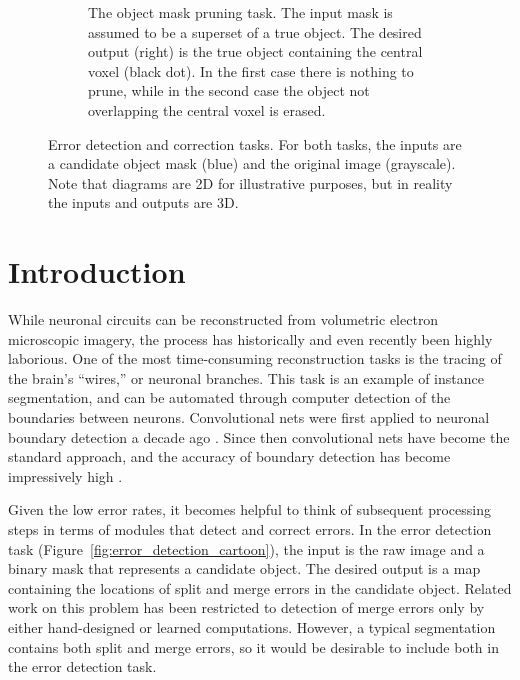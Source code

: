\documentclass{article}
\begin{document}
\begin{figure}[t!]
\begin{center}
\begin{subfigure}[t]{0.45\textwidth}
	\caption{The object mask pruning task. The input mask is assumed to be a superset of a true object. The desired output (right) is the true object containing the central voxel (black dot). In the first case there is nothing to prune, while in the second case the object not overlapping the central voxel is erased.}
	\label{fig:error_correction_cartoon}
\end{subfigure}
        \end{center}
        \caption{Error detection and correction tasks.  For both tasks, the inputs are a candidate object mask (blue) and the original image (grayscale). Note that diagrams are 2D for illustrative purposes, but in reality the inputs and outputs are 3D.}
\end{figure}

\section{Introduction}
While neuronal circuits can be reconstructed from volumetric electron
microscopic imagery, the process has historically
\cite{white1986structure} and even recently \cite{schmidt2017axonal}
been highly laborious. One of the most time-consuming reconstruction
tasks is the tracing of the brain's ``wires,'' or neuronal branches.
This task is an example of instance segmentation, and can be automated through computer detection of the boundaries between neurons. Convolutional nets were first applied to neuronal boundary detection a decade ago \cite{jain2007supervised, boundary_detection}.
Since then convolutional nets have become the standard approach, and
the accuracy of boundary detection has become impressively high  \cite{zeng2017deep, beier2017multicut, kisuk, funke2017deep}.

Given the low error rates, it becomes helpful to think of subsequent processing steps in terms of modules that detect and correct errors. In the error detection task (Figure~\ref{fig:error_detection_cartoon}), the input is the raw image and a binary mask that represents a candidate object. The desired output is a map containing the locations of split and merge errors in the candidate object. Related work on this problem has been restricted to detection of merge errors only by either hand-designed \cite{multipass} or learned \cite{mergenet} computations. However, a typical segmentation contains both split and merge errors, so it would be desirable to include both in the error detection task.
\end{document}
